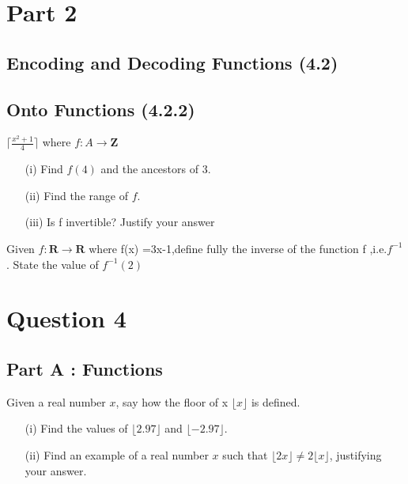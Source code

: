 \section{Part 2}


\subsection*{Encoding and Decoding Functions (4.2)}


\subsection*{Onto Functions (4.2.2)}




$\lceil \frac{x^2+1}{4} \rceil$
where $f : A \rightarrow \textbf{Z}$
\begin{itemize}
	\item[(i)] Find $f(4)$ and the ancestors of 3.
	\item[(ii)] Find the range of $f$.
	\item[(iii)] Is f invertible? Justify your answer
\end{itemize}

Given $f : \textbf{R} \rightarrow \textbf{R}$ where f(x) =3x-1,define fully
the inverse of the function f ,i.e.$f^{-1}$. 
State the value of $f^{-1}(2)$


\section*{Question 4}

\subsection*{Part A : Functions}
Given a real number $x$, say how the floor of x  $\lfloor x \rfloor$ is defined.
\begin{itemize}
	\item[(i)] Find the values of $\lfloor 2.97 \rfloor$ and $\lfloor -2.97 \rfloor$.
	\item[(ii)] Find an example of a real number $x$ such that $\lfloor 2x \rfloor  \neq 2\lfloor x \rfloor$, justifying your answer.
\end{itemize}



